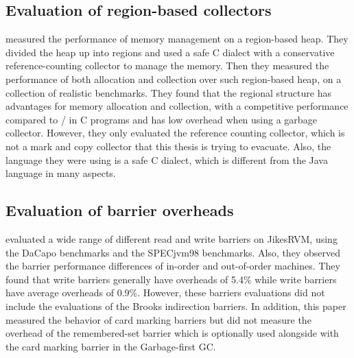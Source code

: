 \subsection{Evaluation of region-based collectors}

\cite{gay1998memory} measured the performance of memory management on a region-based heap.
They divided the heap up into regions and used a safe C dialect
with a conservative reference-counting collector to manage the memory. Then they
measured the performance of both allocation and collection over such region-based heap,
on a collection of realistic benchmarks. They found that the regional structure has
advantages for memory allocation and collection, with a competitive performance
compared to / in C programs and has low overhead when using a garbage collector.
However, they only evaluated the reference counting collector, which is not a
mark and copy collector that this thesis is trying to evacuate. Also, the
language they were using is a safe C dialect, which is different from the Java language
in many aspects.


\subsection{Evaluation of barrier overheads}

\cite{yang2012barriers} evaluated a wide range of different read and write barriers
on JikesRVM, using the DaCapo benchmarks and the SPECjvm98 benchmarks.
Also, they observed the barrier performance differences of in-order and out-of-order machines.
They found that write barriers generally have overheads of 5.4\% while write
barriers have average overheads of 0.9\%. However, these barriers evaluations did not
include the evaluations of the Brooks indirection barriers. In addition, this paper
measured the behavior of card marking barriers but did not measure the overhead of
the remembered-set barrier which is optionally used alongside with the card marking barrier in
the Garbage-first GC.


